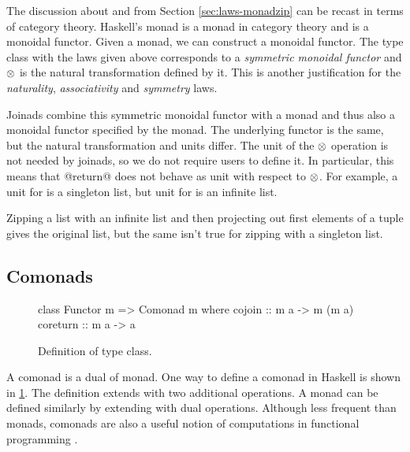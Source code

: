 \documentclass[preprint]{sigplanconf}
\begin{document}
The discussion about  and  from Section \ref{sec:laws-monadzip}
can be recast in terms of category theory. Haskell's monad is a monad in category theory and 
 is a monoidal functor. Given a monad, we can construct a monoidal functor. The 
 type class with the laws given above corresponds to a \textit{symmetric monoidal 
functor} and $\otimes$ is the natural transformation defined by it. This is another justification for 
the \textit{naturality}, \textit{associativity} and \textit{symmetry} laws. 

Joinads combine this symmetric monoidal functor with a monad and thus also a monoidal functor 
specified by the monad. The underlying functor is the same, but the natural transformation and units 
differ. The unit of the $\otimes$ operation is not needed by joinads, so we do not require users to 
define it. In particular, this means that @return@ does not behave as unit with respect to $\otimes$. 
For example, a unit for  is a singleton list, but unit for  is an infinite
list. 

Zipping a list with an infinite list and then projecting out first elements of a tuple
gives the original list, but the same isn't true for zipping with a singleton list.


\subsection{Comonads}
\label{sec:theory-comonads}

\begin{figure}
\begin{code}
class Functor m => Comonad m where
  cojoin :: m a -> m (m a)
  coreturn :: m a -> a
\end{code}
\caption{Definition of  type class. }
\label{fig:comonad-class}
\end{figure}

A comonad is a dual of monad. One way to define a comonad in Haskell is shown in 
\ref{fig:comonad-class}. The definition extends  with two additional operations. 
A monad can be defined similarly by extending  with dual operations.
Although less frequent than monads, comonads are also a useful notion of computations in 
functional programming \cite{comomads-ypnos, comonads-dataflow}.
\end{document}
